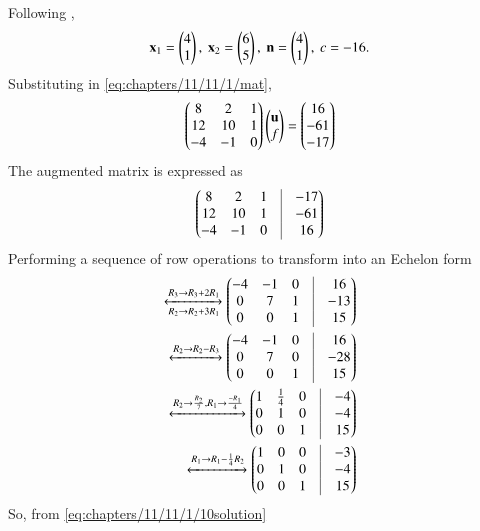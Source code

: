 	Following 
,
\begin{align}
	\label{eq:chapters/11/11/1/10circPoints}
	\mathbf{x}_{1} = \begin{pmatrix}4\\1\end{pmatrix},\ \mathbf{x}_{2} = \begin{pmatrix}6\\5\end{pmatrix},\
	\mathbf{n} = \begin{pmatrix}4 \\ 1\end{pmatrix},\  c= -16.
\end{align}
Substituting  in
	\eqref{eq:chapters/11/11/1/mat},
\begin{align}
	\begin{pmatrix}
	        8 &  2 & 1\\
	       12 & 10 & 1\\
-4 & -1 & 0\end{pmatrix}
	\begin{pmatrix}\mathbf{u}\\f\end{pmatrix} = 
	\begin{pmatrix}16 \\ -61 \\ -17\end{pmatrix}
\end{align}
The augmented matrix is expressed as
\begin{align}
	\myvec{
	        8 &  2 & 1 & \vrule & -17\\
	       12 & 10 & 1 & \vrule & -61\\
-4 & -1 & 0 & \vrule & 16}
\end{align}
Performing a sequence of row operations to transform into an Echelon form
\begin{align}
	\xleftrightarrow[R_2\rightarrow R_2+3R_1]{{R_3\rightarrow R_3+2R_1}}
	\myvec{-4 & -1 & 0 & \vrule & 16\\
	        0 &  7 & 1 & \vrule & -13\\
	        0 &  0 & 1 & \vrule & 15}\\
	\xleftrightarrow[]{{R_2\rightarrow R_2-R_3}}
	\myvec{-4 & -1 & 0 & \vrule & 16\\
	        0 &  7 & 0 & \vrule & -28\\
	        0 &  0 & 1 & \vrule & 15}\\
	\xleftrightarrow[]{{R_2\rightarrow \frac{R_2}{7},R_1\rightarrow \frac{-R_1}{4}}}
	\myvec{ 1 & \frac{1}{4} & 0 & \vrule & -4\\
	        0 &  1 & 0 & \vrule & -4\\
	        0 &  0 & 1 & \vrule & 15}\\
	\label{eq:chapters/11/11/1/10solution}	
	\xleftrightarrow[]{{R_1\rightarrow R_1-\frac{1}{4}R_2}}
	\myvec{ 1 &  0 & 0 & \vrule & -3\\
	        0 &  1 & 0 & \vrule & -4\\
	        0 &  0 & 1 & \vrule & 15}
\end{align}
So, from \eqref{eq:chapters/11/11/1/10solution}
